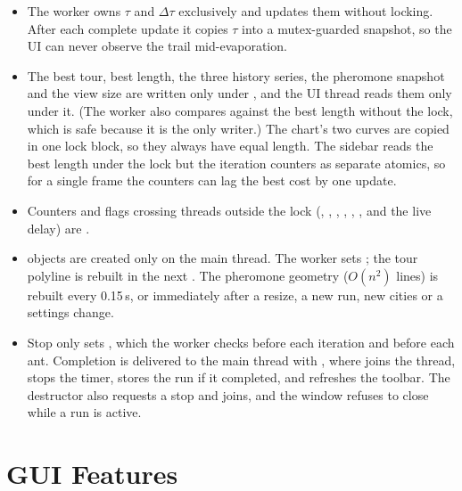 \documentclass[11pt,a4paper]{article}
\begin{document}
\begin{itemize}
  \item The worker owns $\tau$ and $\Delta\tau$ exclusively and updates them without locking. After each
        complete update it copies $\tau$ into a mutex-guarded snapshot, so the UI can never observe the trail
        mid-evaporation.
  \item The best tour, best length, the three history series, the pheromone snapshot and the view size are
        written only under , and the UI thread reads them only under it. (The worker
        also compares against the best length without the lock, which is safe because it is the only
        writer.) The chart's two curves are copied in one lock block, so they always have equal length.
        The sidebar reads the best length under the lock but the iteration counters as separate atomics,
        so for a single frame the counters can lag the best cost by one update.
  \item Counters and flags crossing threads outside the lock (,
        , , , ,
        , and the live  delay) are .
  \item {} objects are created only on the main thread. The worker sets
        ; the tour polyline is rebuilt in the next . The pheromone
        geometry ($O(n^2)$ lines) is rebuilt every 0.15\,s, or immediately after a resize, a new run, new cities
        or a settings change.
  \item Stop only sets , which the worker checks before each iteration and before each
        ant. Completion is delivered to the main thread with , where
         joins the thread, stops the timer, stores the run if it completed,
        and refreshes the toolbar. The  destructor also requests a stop and joins, and the window
        refuses to close while a run is active.
\end{itemize}

\section{GUI Features}
\end{document}
